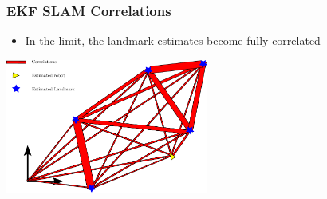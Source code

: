 \begin{frame}
    \frametitle{EKF SLAM Correlations}

    \begin{itemize}
        \item In the limit, the landmark estimates become fully correlated
    \end{itemize}

    \begin{center}
        \includegraphics[width=0.5\textwidth]{../images/ekf_slam/ekf_slam_correlations.pdf}
    \end{center}
\end{frame}

